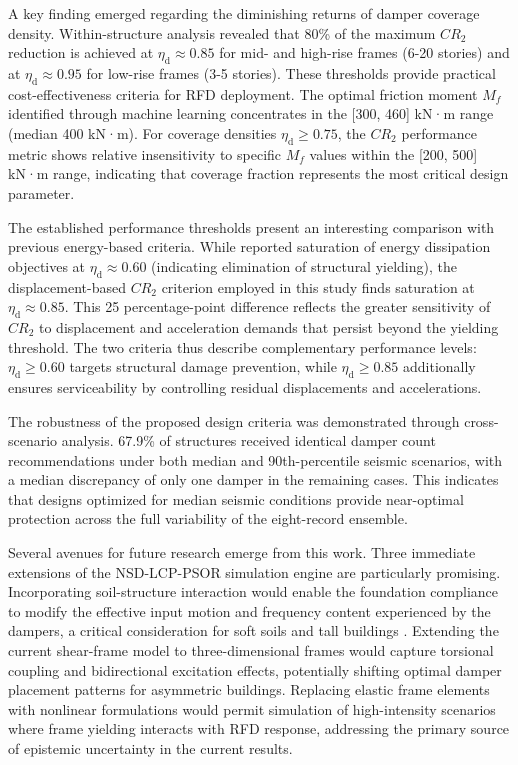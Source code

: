 \documentclass[preprint,12pt,authoryear]{elsarticle}
\newcommand{\etad}{\eta_{\mathrm{d}}}
\newcommand{\Mf}{M_{\!f}}
\begin{document}
A key finding emerged regarding the diminishing returns of damper coverage density. Within-structure analysis revealed that 80\% of the maximum $CR_2$ reduction is achieved at $\etad \approx 0.85$ for mid- and high-rise frames (6-20 stories) and at $\etad \approx 0.95$ for low-rise frames (3-5 stories). These thresholds provide practical cost-effectiveness criteria for RFD deployment. The optimal friction moment $\Mf$ identified through machine learning concentrates in the [300, 460] kN·m range (median 400 kN·m). For coverage densities $\etad \geq 0.75$, the $CR_2$ performance metric shows relative insensitivity to specific $\Mf$ values within the [200, 500] kN·m range, indicating that coverage fraction represents the most critical design parameter.

The established performance thresholds present an interesting comparison with previous energy-based criteria. While \citet{Jarrahi2020sdee} reported saturation of energy dissipation objectives at $\etad \approx 0.60$ (indicating elimination of structural yielding), the displacement-based $CR_2$ criterion employed in this study finds saturation at $\etad \approx 0.85$. This 25 percentage-point difference reflects the greater sensitivity of $CR_2$ to displacement and acceleration demands that persist beyond the yielding threshold. The two criteria thus describe complementary performance levels: $\etad \geq 0.60$ targets structural damage prevention, while $\etad \geq 0.85$ additionally ensures serviceability by controlling residual displacements and accelerations.

The robustness of the proposed design criteria was demonstrated through cross-scenario analysis. 67.9\% of structures received identical damper count recommendations under both median and 90th-percentile seismic scenarios, with a median discrepancy of only one damper in the remaining cases. This indicates that designs optimized for median seismic conditions provide near-optimal protection across the full variability of the eight-record ensemble.

Several avenues for future research emerge from this work. Three immediate extensions of the NSD-LCP-PSOR simulation engine are particularly promising. Incorporating soil-structure interaction would enable the foundation compliance to modify the effective input motion and frequency content experienced by the dampers, a critical consideration for soft soils and tall buildings \citep{jarrahi_soil-structure_2022}. Extending the current shear-frame model to three-dimensional frames would capture torsional coupling and bidirectional excitation effects, potentially shifting optimal damper placement patterns for asymmetric buildings. Replacing elastic frame elements with nonlinear formulations would permit simulation of high-intensity scenarios where frame yielding interacts with RFD response, addressing the primary source of epistemic uncertainty in the current results.
\end{document}
